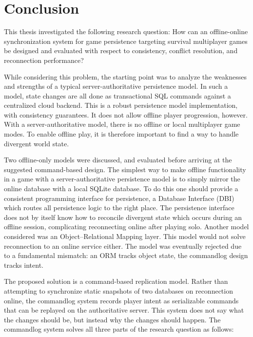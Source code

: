 \documentclass{article}
\begin{document}
\newpage

\section{Conclusion}
\label{sec:conclusion}

This thesis investigated the following research question: How can an offline-online synchronization system for game persistence targeting survival multiplayer games be designed and evaluated with respect to consistency, conflict resolution, and reconnection performance?

While considering this problem, the starting point was to analyze the weaknesses and strengths of a typical server-authoritative persistence model. In such a model, state changes are all done as transactional SQL commands against a centralized cloud backend. This is a robust persistence model implementation, with consistency guarantees. It does not allow offline player progression, however. With a server-authoritative model, there is no offline or local multiplayer game modes. To enable offline play, it is therefore important to find a way to handle divergent world state.

Two offline-only models were discussed, and evaluated before arriving at the suggested command-based design. The simplest way to make offline functionality in a game with a server-authoritative persistence model is to simply mirror the online database with a local SQLite database. To do this one should provide a consistent programming interface for persistence, a Database Interface (DBI) which routes all persistence logic to the right place. The persistence interface does not by itself know how to reconcile divergent state which occurs during an offline session, complicating reconnecting online after playing solo. Another model considered was an Object–Relational Mapping layer. This model would not solve reconnection to an online service either. The model was eventually rejected due to a fundamental mismatch: an ORM tracks object state, the commandlog design tracks intent.

The proposed solution is a command-based replication model. Rather than attempting to synchronize static snapshots of two databases on reconnection online, the commandlog system records player intent as serializable commands that can be replayed on the authoritative server. This system does not say what the changes should be, but instead why the changes should happen. The commandlog system solves all three parts of the research question as follows:
\end{document}
